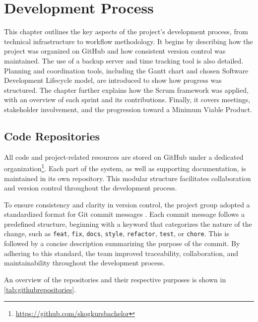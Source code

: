 \chapter{Development Process}\label{chap:developmentprocess}

This chapter outlines the key aspects of the project's development process, from technical infrastructure to workflow methodology. It begins by describing how the project was organized on GitHub and how consistent version control was maintained. The use of a backup server and time tracking tool is also detailed. Planning and coordination tools, including the Gantt chart and chosen Software Development Lifecycle model, are introduced to show how progress was structured. The chapter further explains how the Scrum framework was applied, with an overview of each sprint and its contributions. Finally, it covers meetings, stakeholder involvement, and the progression toward a Minimum Viable Product.

\section{Code Repositories}

All code and project-related resources are stored on GitHub under a dedicated organization\footnote{\url{https://github.com/skogkursbachelor}}. Each part of the system, as well as supporting documentation, is maintained in its own repository. This modular structure facilitates collaboration and version control throughout the development process. 

To ensure consistency and clarity in version control, the project group adopted a standardized format for Git commit messages \cite{commit_standard}. Each commit message follows a predefined structure, beginning with a keyword that categorizes the nature of the change, such as \texttt{feat}, \texttt{fix}, \texttt{docs}, \texttt{style}, \texttt{refactor}, \texttt{test}, or \texttt{chore}. This is followed by a concise description summarizing the purpose of the commit. By adhering to this standard, the team improved traceability, collaboration, and maintainability throughout the development process.

An overview of the repositories and their respective purposes is shown in \autoref{tab:githubrepositories}.


